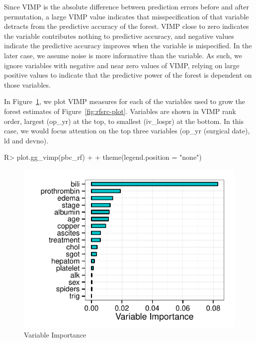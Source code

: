 \documentclass[nojss]{jss}\usepackage[]{graphicx}\usepackage[]{color}
\makeatletter
\def\maxwidth{ %
  \ifdim\Gin@nat@width>\linewidth
    \linewidth
  \else
    \Gin@nat@width
  \fi
}
\makeatother
\begin{document}
Since VIMP is the absolute difference between prediction errors before and after permutation, a large VIMP value indicates that misspecification of that variable detracts from the predictive accuracy of the forest. VIMP close to zero indicates the variable contributes nothing to predictive accuracy, and negative values indicate the predictive accuracy improves when the variable is mispecified. In the later case, we assume noise is more informative than the variable. As such, we ignore variables with negative and near zero values of VIMP, relying on large positive values to indicate that the predictive power of the forest is dependent on those variables. 

In Figure~\ref{fig:rf-vimp}, we plot VIMP measures for each of the variables used to grow the forest estimates of Figure~\ref{fig:rfsrc-plot}. Variables are shown in VIMP rank order, largest (op\_yr) at the top, to smallest (iv\_lospr) at the bottom. In this case, we would focus attention on the top three variables (op\_yr (surgical date), ld and devno).
\begin{Schunk}
\begin{Sinput}
R> plot.gg_vimp(pbc_rf) + 
+  theme(legend.position = "none")
\end{Sinput}
\begin{figure}[!htpb]

{\centering \includegraphics[width=\maxwidth]{figure/rfs-rf-vimp-1} 

}

\caption[Variable Importance]{Variable Importance\label{fig:rf-vimp}}
\end{figure}
\end{Schunk}
\end{document}
